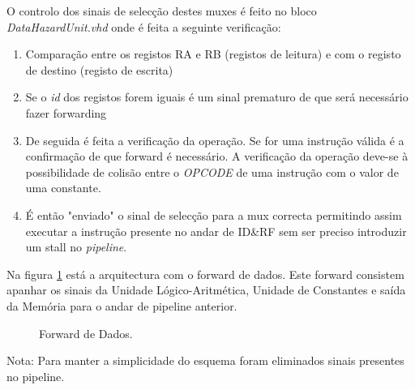 O controlo dos sinais de selecção destes muxes é feito no bloco \textit{DataHazardUnit.vhd} onde é feita a seguinte verificação:
\begin{enumerate}
	\item Comparação entre os registos RA e RB (registos de leitura) e com o registo de destino (registo de escrita)
	\item Se o \textit{id} dos registos forem iguais é um sinal prematuro de que será necessário fazer forwarding
	\item De seguida é feita a verificação da operação. Se for uma instrução válida é a confirmação de que forward é necessário. A verificação da operação deve-se à possibilidade de colisão entre o \textit{OPCODE} de uma instrução com o valor de uma constante.
	\item É então "enviado" o sinal de selecção para a mux correcta permitindo assim executar a instrução presente no andar de ID\&RF sem ser preciso introduzir um stall no \textit{pipeline}.
\end{enumerate}

Na figura \ref{forward} está a arquitectura com o forward de dados. Este forward consistem apanhar os sinais da Unidade Lógico-Aritmética, Unidade de Constantes e saída da Memória para o andar de pipeline anterior.

\begin{figure}[H]
	\begin{center}
		\caption{Forward de Dados.}
		\label{forward}
	\end{center}
\end{figure}

Nota: Para manter a simplicidade do esquema foram eliminados sinais presentes no pipeline.
